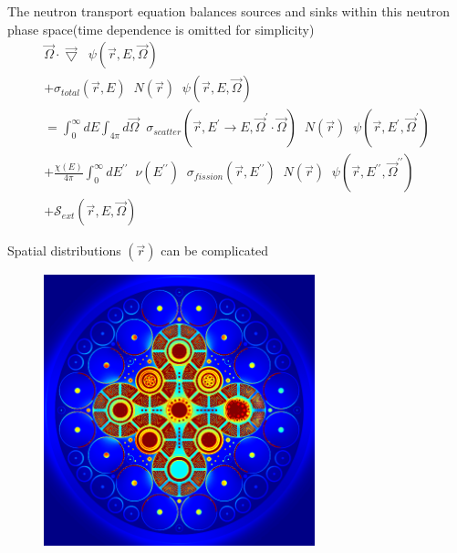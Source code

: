 \documentclass{beamer}
\begin{document}
        \begin{frame}{The neutron transport equation balances sources and sinks within this neutron phase space}{(time dependence is omitted for simplicity)}
            \begin{equation*}
                \begin{split}
                    \vec \Omega \cdot \vec \bigtriangledown \; \; \psi(\vec r, E, \vec \Omega) \\
                    + \sigma_{total}(\vec r, E) \; \; N(\vec r) \; \; \psi(\vec r, E, \vec\Omega) \\
                    = \int_0^\infty \! \! \! \! dE \int_{4\pi} \! \! \! \! d\vec\Omega \; \; \sigma_{scatter}(\vec r, E^\prime \rightarrow E, \vec \Omega^\prime \cdot \vec \Omega) \; \; N(\vec r) \; \; \psi(\vec r, E^\prime, \vec\Omega^\prime) \\
                    + \frac{\chi(E)}{4\pi} \int_0^\infty \! \! \! \! dE^{\prime\prime} \; \; \nu (E^{\prime\prime}) \; \; \sigma_{fission}(\vec r, E^{\prime\prime}) \; \; N(\vec r) \; \; \psi(\vec r, E^{\prime\prime}, \vec\Omega^{\prime\prime}) \\
                    + \mathcal{S}_{ext}(\vec r, E, \vec\Omega)
                \end{split}
            \end{equation*}
        \end{frame}

        \begin{frame}{Spatial distributions $(\vec r)$ can be complicated}
            \begin{figure}
                \centering
                \includegraphics[width=0.7\textwidth]{./img/spaceFlux1.png}
                \caption*{}
            \end{figure}
        \end{frame}
\end{document}
